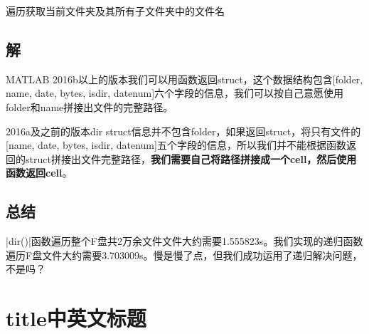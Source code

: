 \begin{algorithm}[H]
\caption{遍历获取当前文件夹及其所有子文件夹中的文件名}
\label{get_all_file_name}
\end{algorithm}

\subsection*{解}

MATLAB 2016b以上的版本我们可以用函数返回struct，这个数据结构包含[folder, name, date, bytes, isdir, datenum]六个字段的信息，我们可以按自己意愿使用folder和name拼接出文件的完整路径。


2016a及之前的版本dir struct信息并不包含folder，如果返回struct，将只有文件的[name, date, bytes, isdir, datenum]五个字段的信息，所以我们并不能根据函数返回的struct拼接出文件完整路径，\textbf{我们需要自己将路径拼接成一个cell，然后使用函数返回cell}。


\subsection*{总结}
\Matlabinline|dir()|函数遍历整个F盘共2万余文件文件大约需要1.555823s。我们实现的递归函数遍历F盘文件大约需要3.703009s。慢是慢了点，但我们成功运用了递归解决问题，不是吗？

\section{title中英文标题}